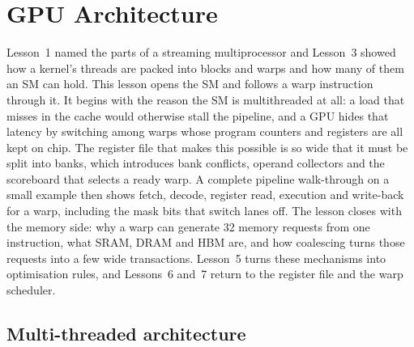 \documentclass[../main.tex]{subfiles}
\begin{document}
\chapter{GPU Architecture}

Lesson~1 named the parts of a streaming multiprocessor and Lesson~3
showed how a kernel's threads are packed into blocks and warps and how
many of them an SM can hold.  This lesson opens the SM and follows a
warp instruction through it.  It begins with the reason the SM is
multithreaded at all: a load that misses in the cache would otherwise
stall the pipeline, and a GPU hides that latency by switching among
warps whose program counters and registers are all kept on chip.  The
register file that makes this possible is so wide that it must be split
into banks, which introduces bank conflicts, operand collectors and the
scoreboard that selects a ready warp.  A complete pipeline walk-through
on a small example then shows fetch, decode, register read, execution
and write-back for a warp, including the mask bits that switch lanes
off.  The lesson closes with the memory side: why a warp can generate
32 memory requests from one instruction, what SRAM, DRAM and HBM are,
and how coalescing turns those requests into a few wide transactions.
Lesson~5 turns these mechanisms into optimisation rules, and Lessons~6
and~7 return to the register file and the warp scheduler.

\section{Multi-threaded architecture}
\label{sec:l04-multithreading}
\end{document}
